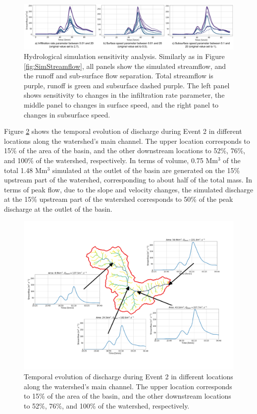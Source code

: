 \documentclass[hess, manuscript]{copernicus}
\begin{document}
\begin{figure}[t]
\centering
 \includegraphics[width=14cm]{Figures/Parameter_variation_analysis.png}
 \caption{Hydrological simulation sensitivity analysis. Similarly as in Figure \ref{fig:SimStreamflow}, all panels show the simulated streamflow, and the runoff and sub-surface flow separation. Total streamflow is purple, runoff is green and subsurface dashed purple. The left panel shows sensitivity to changes in the infiltration rate  parameter, the middle panel to changes in surface speed, and the right panel to changes in subsurface speed.}
    \label{fig:SimStreamflowSA}
\end{figure}



Figure \ref{fig:dischargeEvent2} shows the temporal evolution of discharge during Event 2 in different locations along the watershed's main channel. The upper location corresponds to 15\% of the area of the basin, and the other downstream locations to 52\%, 76\%, and 100\% of the watershed, respectively. In terms of volume, 0.75 Mm$^3$ of the total 1.48 Mm$^3$ simulated at the outlet of the basin are generated on the 15\% upstream part of the watershed,  corresponding to about half of the total mass. In terms of peak flow, due to the slope and velocity changes, the simulated discharge at the 15\% upstream part of the watershed corresponds to 50\% of the peak discharge at the outlet of the basin.\\


\begin{figure}[t]
\centering
\includegraphics[width =12cm]{Figures/Evolucion_evento.png}
\caption{Temporal evolution of discharge during Event 2 in different locations along the watershed's main channel. The upper location corresponds to 15\% of the area of the basin, and the other downstream locations to 52\%, 76\%, and 100\% of the watershed, respectively.}
\label{fig:dischargeEvent2}
\end{figure}
\end{document}
